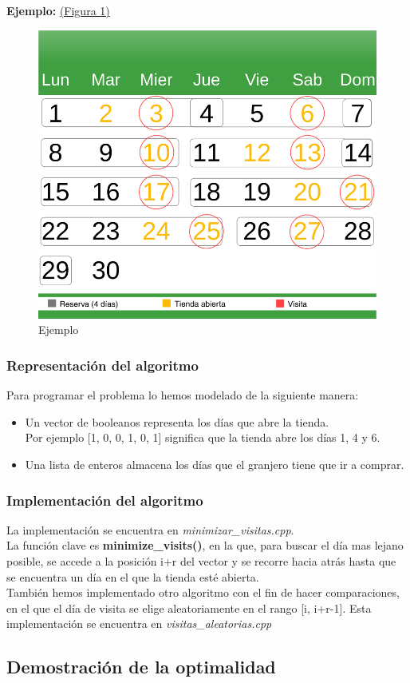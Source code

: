 \textbf{Ejemplo:} \hyperref[ejemplo]{(Figura 1)}\\
\begin{figure}[h]
\centering
	\includegraphics[width=1\textwidth]{Imagenes/calendario.png}
	\caption{Ejemplo} 
\end{figure}
\label{ejemplo} 


\subsubsection{Representación del algoritmo}

Para programar el problema lo hemos modelado de la siguiente manera:\\

\begin{itemize}
\item Un vector de booleanos representa los días que abre la tienda.\\
Por ejemplo [1, 0, 0, 1, 0, 1] significa que la tienda abre los días 1, 4 y 6.\\
\item Una lista de enteros almacena los días que el granjero tiene que ir a comprar.
\end{itemize}


\subsubsection{Implementación del algoritmo}

La implementación se encuentra en \textit{minimizar\_visitas.cpp}.\\
La función clave es \textbf{minimize\_visits()}, en la que, para buscar el día mas lejano posible, se accede a la posición i+r del vector y se recorre hacia atrás hasta que se encuentra un día en el que la tienda esté abierta.\\

También hemos implementado otro algoritmo con el fin de hacer comparaciones, en el que el día de visita se elige aleatoriamente en el rango [i, i+r-1]. Esta implementación se encuentra en \textit{visitas\_aleatorias.cpp}\\



\subsection{Demostración de la optimalidad}
